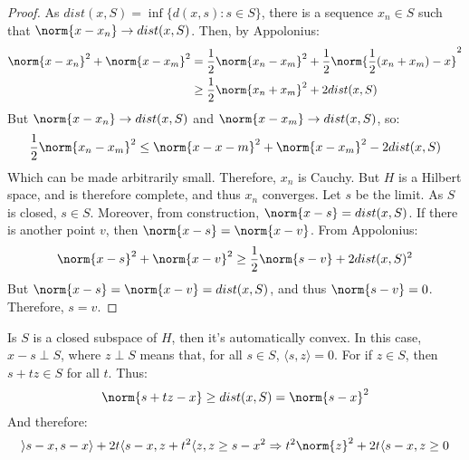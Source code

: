             \begin{proof}
                As $dist(x,S)=\inf\{d(x,s):s\in{S}\}$, there is
                a sequence $x_{n}\in{S}$ such that
                $\norm{x-x_{n}}\rightarrow{dist(x,S)}$. Then, by
                Appolonius:
                \begin{align*}
                    \norm{x-x_{n}}^{2}+\norm{x-x_{m}}^{2}
                    &=\frac{1}{2}\norm{x_{n}-x_{m}}^{2}
                    +\frac{1}{2}
                    \norm{\frac{1}{2}(x_{n}+x_{m})-x}^{2}\\
                    &\geq\frac{1}{2}\norm{x_{n}+x_{m}}^{2}
                    +2dist(x,S)
                \end{align*}
                But $\norm{x-x_{n}}\rightarrow{dist(x,S)}$ and
                $\norm{x-x_{m}}\rightarrow{dist(x,S)}$, so:
                \begin{equation*}
                    \frac{1}{2}\norm{x_{n}-x_{m}}^{2}
                    \leq\norm{x-x-{m}}^{2}
                    +\norm{x-x_{m}}^{2}-2dist(x,S)
                \end{equation*}
                Which can be made arbitrarily small. Therefore,
                $x_{n}$ is Cauchy. But $H$ is a Hilbert space, and
                is therefore complete, and thus $x_{n}$ converges.
                Let $s$ be the limit. As $S$ is closed, $s\in{S}$.
                Moreover, from construction,
                $\norm{x-s}=dist(x,S)$. If there is another point
                $v$, then $\norm{x-s}=\norm{x-v}$. From
                Appolonius:
                \begin{equation*}
                    \norm{x-s}^{2}+\norm{x-v}^{2}
                    \geq\frac{1}{2}\norm{s-v}+2dist(x,S)^{2}
                \end{equation*}
                But $\norm{x-s}=\norm{x-v}=dist(x,S)$, and
                thus $\norm{s-v}=0$. Therefore, $s=v$.
            \end{proof}
            Is $S$ is a closed subspace of $H$, then it's
            automatically convex. In this case, $x-s\perp{S}$,
            where $z\perp{S}$ means that, for all
            $s\in{S}$, $\langle{s,z}\rangle=0$. For if
            $z\in{S}$, then $s+tz\in{S}$ for all $t$. Thus:
            \begin{equation*}
                \norm{s+tz-x}\geq{dist(x,S)}=\norm{s-x}^{2}
            \end{equation*}
            And therefore:
            \begin{equation*}
                \rangle{s-x,s-x}\rangle+2t\langle{s-x,z}
                +t^{2}\langle{z,z}\geq{s-x}^{2}
                \Rightarrow{t^{2}\norm{z}^{2}+2t\langle{s-x,z}}
                \geq{0}
            \end{equation*}
